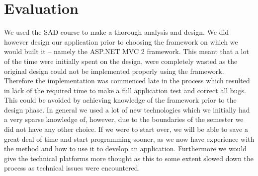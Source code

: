 \chapter{Evaluation}
\label{chap:discussion}
We used the SAD course to make a thorough analysis and design.
We did however design our application prior to choosing the framework on which we would built it -- namely the ASP.NET MVC 2 framework.
This meant that a lot of the time were initially spent on the design, were completely wasted as the original design could not be implemented properly using the framework.
Therefore the implementation was commenced late in the process which resulted in lack of the required time to make a full application test and correct all bugs.
This could be avoided by achieving knowledge of the framework prior to the design phase. 
In general we used a lot of new technologies which we initially had a very sparse knowledge of, however, due to the boundaries of the semester we did not have any other choice.
If we were to start over, we will be able to save a great deal of time and start programming sooner, as we now have experience with the \ooad{} method and how to use it to develop an application. Furthermore we would give the technical platforms more thought as this to some extent slowed down the process as technical issues were encountered.

